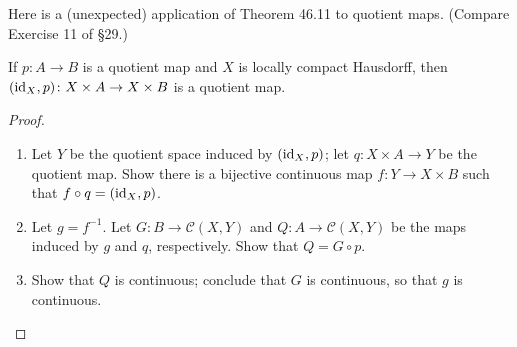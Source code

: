 \begin{problem}[Munkres \S46, Ex.\,9(a,b,c)]
Here is a (unexpected) application of Theorem 46.11 to quotient
maps. (Compare Exercise 11 of \S29.)
\begin{theorem*}
If $p\colon A\to B$ is a quotient map and $X$ is locally compact
Hausdorff, then $(\operatorname{id}_X,p)\colon X\times A\to X\times B$ is a
quotient map.
\begin{proof}
\renewcommand\qedsymbol{\null}
\begin{enumerate}[label=(\alph*)]
\item Let $Y$ be the quotient space induced by $(\operatorname{id}_X,p)$; let
  $q\colon X\times A\to Y$ be the quotient map. Show there is a
  bijective continuous map $f\colon Y\to X\times B$ such that
  $f\circ q=(\operatorname{id}_X,p)$.
\item Let $g=f^{-1}$. Let $G\colon B\to\mathcal{C}(X,Y)$ and
  $Q\colon A\to\mathcal{C}(X,Y)$ be the maps induced by $g$ and
  $q$, respectively. Show that $Q=G\circ p$.
\item Show that $Q$ is continuous; conclude that $G$ is
  continuous, so that $g$ is continuous.
\end{enumerate}
\end{proof}
\end{theorem*}
\end{problem}
